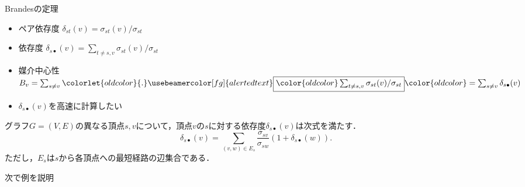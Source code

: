 \documentclass[dvipdfmx,fleqn]{beamer}
\begin{document}
\begin{frame}{Brandesの定理}
  \begin{itemize}\small
  \item ペア依存度 $\delta_{st}(v)=\sigma_{st}(v)/\sigma_{st}$
  \item 依存度
    $\delta_{s\bullet}(v)=\sum_{t\neq s,v}\sigma_{st}(v)/\sigma_{st}$
  \item 媒介中心性
    $B_v=\sum_{s\neq v}\colorlet{oldcolor}{.}\usebeamercolor[fg]{alerted text}\fbox{$\color{oldcolor}\sum_{t\neq s,v}\sigma_{st}(v)/\sigma_{st}$}\color{oldcolor}=\sum_{s\neq v}\delta_{s\bullet}(v)$
  \item $\delta_{s\bullet}(v)$を高速に計算したい
  \end{itemize}
  \begin{theorem}\rm
    \label{th:implicit-dependency}
    グラフ$G=(V,E)$の異なる頂点$s,v$について，頂点$v$の$s$に対する依存度$\delta_{s\bullet}(v)$は次式を満たす．
    \begin{equation*}
      \delta_{s\bullet}(v)=\sum_{(v,w)\in E_s}\frac{\sigma_{sv}}{\sigma_{sw}}(1+\delta_{s\bullet}(w)).
    \end{equation*}
    ただし，$E_s$は$s$から各頂点への最短経路の辺集合である．
  \end{theorem}
  \begin{flushright}
    \alert{次で例を説明}
  \end{flushright}
\end{frame}
\end{document}
